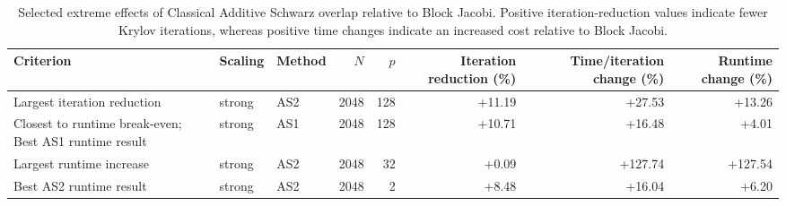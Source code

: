\begin{table}[htbp]
    \centering
    \caption{Selected extreme effects of Classical Additive Schwarz overlap relative to Block Jacobi. Positive iteration-reduction values indicate fewer Krylov iterations, whereas positive time changes indicate an increased cost relative to Block Jacobi.}
    \label{tab:overlap-extreme-effects}
    \small
    \setlength{\tabcolsep}{4pt}
    \begin{tabular}{p{4.2cm}llrrrrr}
        \toprule
        Criterion & Scaling & Method & $N$ & $p$ & Iteration reduction (\%) & Time/iteration change (\%) & Runtime change (\%) \\
        \midrule
        Largest iteration reduction & strong & AS2 & 2048 & 128 & +11.19 & +27.53 & +13.26 \\
        Closest to runtime break-even; Best AS1 runtime result & strong & AS1 & 2048 & 128 & +10.71 & +16.48 & +4.01 \\
        Largest runtime increase & strong & AS2 & 2048 & 32 & +0.09 & +127.74 & +127.54 \\
        Best AS2 runtime result & strong & AS2 & 2048 & 2 & +8.48 & +16.04 & +6.20 \\
        \bottomrule
    \end{tabular}
\end{table}
